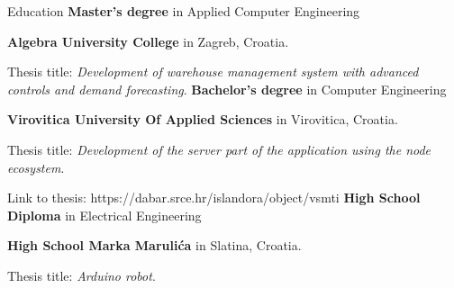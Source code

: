 \begin{rubric}{Education}
	\textbf{Master's degree} in Applied Computer Engineering \par \textbf{Algebra University College} in Zagreb, Croatia.
	\par Thesis title: \emph{Development of warehouse management system with advanced controls and demand forecasting}.
	\textbf{Bachelor's degree} in Computer Engineering \par \textbf{Virovitica University Of Applied Sciences} in Virovitica, Croatia.\par
	Thesis title: \emph{Development of the server part of the application using the node ecosystem}.
	\par Link to thesis: https://dabar.srce.hr/islandora/object/vsmti%
	\textbf{High School Diploma} in Electrical Engineering \par \textbf{High School Marka Marulića} in Slatina, Croatia.\par
	Thesis title: \emph{Arduino robot}.
\end{rubric}